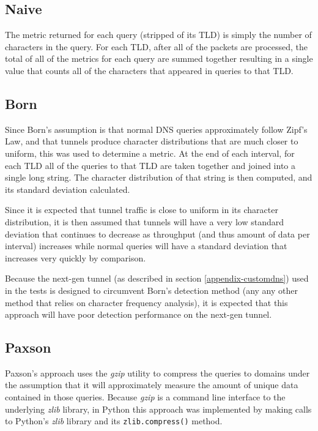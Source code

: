 \documentclass[12pt]{report}
\theoremstyle{remark}
\theoremstyle{definition}
\theoremstyle{definition}
\theoremstyle{definition}
\begin{document}
\subsection{Naive}
\label{implementation-naive}
The metric returned for each query (stripped of its TLD) is simply the number of
characters in the query. For each TLD, after all of the packets are processed,
the total of all of the metrics for each query are summed together resulting in
a single value that counts all of the characters that appeared in queries to
that TLD.

\subsection{Born}

Since Born's\cite{Born2010.cfa} assumption is that normal DNS queries
approximately follow Zipf's Law, and that tunnels produce character
distributions that are much closer to uniform, this was used to determine a
metric. At the end of each interval, for each TLD all of the queries to that TLD
are taken together and joined into a single long string. The character
distribution of that string is then computed, and its standard deviation
calculated.

Since it is expected that tunnel traffic is close to uniform in its character
distribution, it is then assumed that tunnels will have a very low standard
deviation that continues to decrease as throughput (and thus amount of data per
interval) increases while normal queries will have a standard deviation that
increases very quickly by comparison.

Because the next-gen tunnel (as described in section \ref{appendix-customdns})
used in the tests is designed to circumvent Born's detection method (any any
other method that relies on character frequency analysis), it is expected that
this approach will have poor detection performance on the next-gen tunnel.

\subsection{Paxson}
Paxson's\cite{Paxson2011} approach uses the \emph{gzip} utility to compress the
queries to domains under the assumption that it will approximately measure the
amount of unique data contained in those queries. Because \emph{gzip} is a
command line interface to the underlying \emph{zlib} library, in Python this
approach was implemented by making calls to Python's \emph{zlib} library and its
\texttt{zlib.compress()} method.
\end{document}
